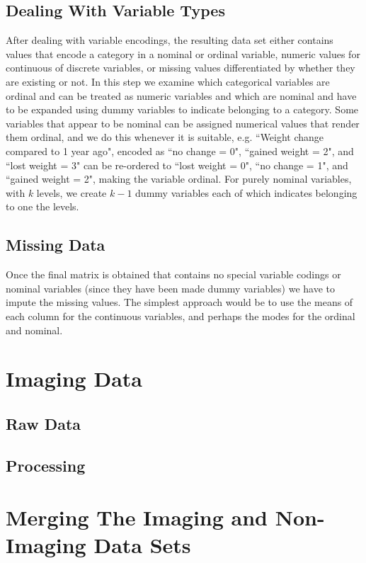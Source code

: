 \documentclass{article}
\begin{document}
\subsection*{Dealing With Variable Types}
After dealing with variable encodings, the resulting data set either contains values that encode a category in a nominal or ordinal variable, numeric values for continuous of discrete variables, or missing values differentiated by whether they are existing or not. In this step we examine which categorical variables are ordinal and can be treated as numeric variables and which are nominal and have to be expanded using dummy variables to indicate belonging to a category. Some variables that appear to be nominal can be assigned numerical values that render them ordinal, and we do this whenever it is suitable, e.g. ``Weight change compared to 1 year ago", encoded as ``no change = 0", ``gained weight = 2", and ``lost weight = 3" can be re-ordered to ``lost weight = 0", ``no change = 1", and ``gained weight = 2", making the variable ordinal. For purely nominal variables, with $k$ levels, we create $k-1$ dummy variables each of which indicates belonging to one the levels. 

\subsection*{Missing Data}
Once the final matrix is obtained that contains no special variable codings or nominal variables (since they have been made dummy variables) we have to impute the missing values. The simplest approach would be to use the means of each column for the continuous variables, and perhaps the modes for the ordinal and nominal. 


\section{Imaging Data}


\subsection*{Raw Data}

\subsection*{Processing}


\section{Merging The Imaging and Non-Imaging Data Sets}
\end{document}
